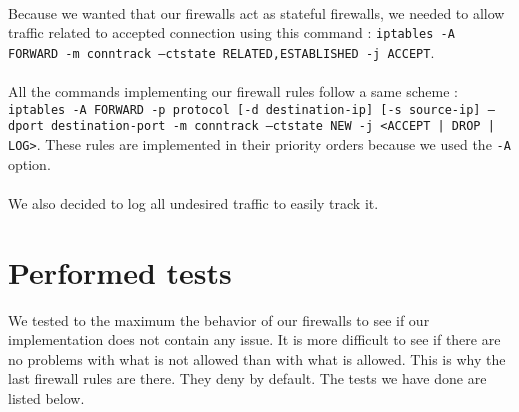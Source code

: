 \documentclass[a4paper, 11pt, oneside]{article}
\begin{document}
\paragraph{}Because we wanted that our firewalls act as stateful firewalls, we needed to allow traffic related to accepted connection using this command : \texttt{iptables -A FORWARD -m conntrack --ctstate RELATED,ESTABLISHED -j ACCEPT}.

\paragraph{}All the commands implementing our firewall rules follow a same scheme : \texttt{iptables -A FORWARD -p protocol [-d destination-ip] [-s source-ip] --dport destination-port -m conntrack --ctstate NEW -j <ACCEPT | DROP | LOG>}. These rules are implemented in their priority orders because we used the \texttt{-A} option. 

\paragraph{}We also decided to log all undesired traffic to easily track it.

\section{Performed tests}

We tested to the maximum the behavior of our firewalls to see if our implementation does not contain any issue. It is more difficult to see if there are no problems with what is not allowed than with what is allowed. This is why the last firewall rules are there. They deny by default. The tests we have done are listed below.
\end{document}
